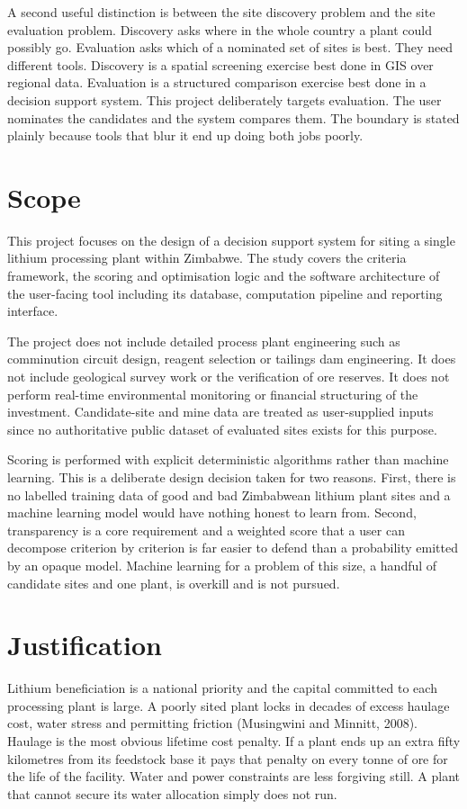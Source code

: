 \documentclass[12pt,a4paper]{report}
\begin{document}
A second useful distinction is between the site discovery problem and
the site evaluation problem. Discovery asks where in the whole country
a plant could possibly go. Evaluation asks which of a nominated set of
sites is best. They need different tools. Discovery is a spatial
screening exercise best done in GIS over regional data. Evaluation is
a structured comparison exercise best done in a decision support
system. This project deliberately targets evaluation. The user
nominates the candidates and the system compares them. The boundary
is stated plainly because tools that blur it end up doing both jobs
poorly.

\section{Scope}
This project focuses on the design of a decision support system for
siting a single lithium processing plant within Zimbabwe. The study
covers the criteria framework, the scoring and optimisation logic and
the software architecture of the user-facing tool including its
database, computation pipeline and reporting interface.

The project does not include detailed process plant engineering such
as comminution circuit design, reagent selection or tailings dam
engineering. It does not include geological survey work or the
verification of ore reserves. It does not perform real-time
environmental monitoring or financial structuring of the investment.
Candidate-site and mine data are treated as user-supplied inputs since
no authoritative public dataset of evaluated sites exists for this
purpose.

Scoring is performed with explicit deterministic algorithms rather
than machine learning. This is a deliberate design decision taken for
two reasons. First, there is no labelled training data of good and bad
Zimbabwean lithium plant sites and a machine learning model would have
nothing honest to learn from. Second, transparency is a core
requirement and a weighted score that a user can decompose criterion
by criterion is far easier to defend than a probability emitted by an
opaque model. Machine learning for a problem of this size, a handful
of candidate sites and one plant, is overkill and is not pursued.

\section{Justification}
Lithium beneficiation is a national priority and the capital committed
to each processing plant is large. A poorly sited plant locks in
decades of excess haulage cost, water stress and permitting friction
(Musingwini and Minnitt, 2008). Haulage is the most obvious lifetime
cost penalty. If a plant ends up an extra fifty kilometres from its
feedstock base it pays that penalty on every tonne of ore for the life
of the facility. Water and power constraints are less forgiving still.
A plant that cannot secure its water allocation simply does not run.
\end{document}

